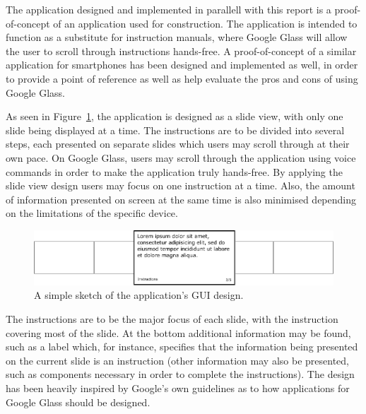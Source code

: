 The application designed and implemented in parallell with this report is a proof-of-concept of an application used for construction. The application is intended to function as a substitute for instruction manuals, where Google Glass will allow the user to scroll through instructions hands-free. A proof-of-concept of a similar application for smartphones has been designed and implemented as well, in order to provide a point of reference as well as help evaluate the pros and cons of using Google Glass.

As seen in Figure~\ref{cardDesign}, the application is designed as a slide view, with only one slide being displayed at a time. The instructions are to be divided into several steps, each presented on separate slides which users may scroll through at their own pace. On Google Glass, users may scroll through the application using voice commands in order to make the application truly hands-free. By applying the slide view design users may focus on one instruction at a time. Also, the amount of information presented on screen at the same time is also minimised depending on the limitations of the specific device.

	\begin{figure}[ht!]
		\centering
		\includegraphics[width=150mm]{images/cardDesign2}
		\caption{A simple sketch of the application's GUI design.}
		\label{cardDesign}
	\end{figure}

The instructions are to be the major focus of each slide, with the instruction covering most of the slide. At the bottom additional information may be found, such as a label which, for instance, specifies that the information being presented on the current slide is an instruction (other information may also be presented, such as components necessary in order to complete the instructions). The design has been heavily inspired by Google's own guidelines as to how applications for Google Glass should be designed.

